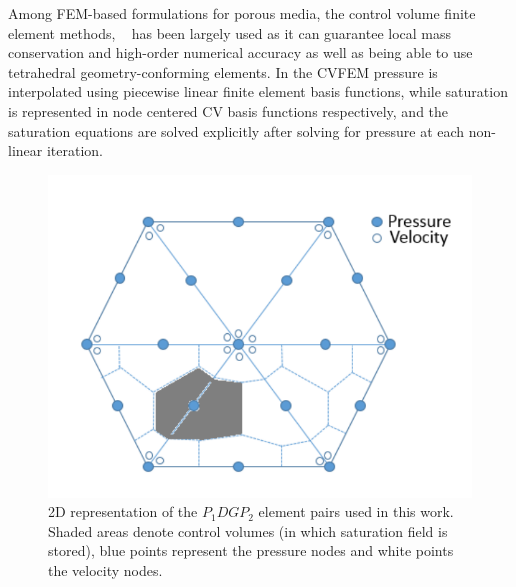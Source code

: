 \documentclass[preprint,authoryear,12pt]{elsarticle}
\begin{document}
\medskip
Among FEM-based formulations for porous media, the control volume finite element methods, ~\citep[CVFEM,][]{fung_1992} has been largely used as it can guarantee local mass conservation and high-order numerical accuracy as well as being able to use tetrahedral geometry-conforming elements. In the CVFEM pressure is interpolated using piecewise linear finite element basis functions, %
while saturation is represented in node centered CV basis functions respectively, and the saturation equations are solved explicitly after solving for pressure at each non-linear iteration. 

\begin{figure}[h]
\centering
\includegraphics[width=.5\textwidth]{./Pics/P1DGP2.pdf}
\caption{2D representation of the $P_{1}DGP_{2}$ element pairs used in this work. Shaded areas denote control volumes (in which saturation field is stored), blue points represent the pressure nodes and white points the velocity nodes.}
\label{fig:fem_cv}
\end{figure}
\end{document}
